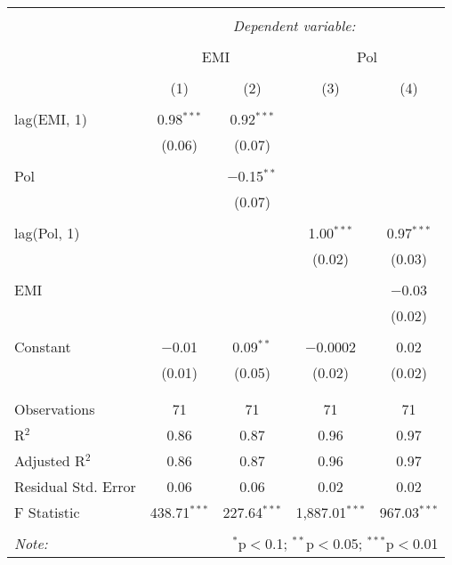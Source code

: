 
\begin{table}[!htbp] \centering 
  \caption{} 
  \label{} 
\begin{tabular}{@{\extracolsep{5pt}}lcccc} 
\\[-1.8ex]\hline 
\hline \\[-1.8ex] 
 & \multicolumn{4}{c}{\textit{Dependent variable:}} \\ 
\cline{2-5} 
\\[-1.8ex] & \multicolumn{2}{c}{EMI} & \multicolumn{2}{c}{Pol} \\ 
\\[-1.8ex] & (1) & (2) & (3) & (4)\\ 
\hline \\[-1.8ex] 
 lag(EMI, 1) & 0.98$^{***}$ & 0.92$^{***}$ &  &  \\ 
  & (0.06) & (0.07) &  &  \\ 
  & & & & \\ 
 Pol &  & $-$0.15$^{**}$ &  &  \\ 
  &  & (0.07) &  &  \\ 
  & & & & \\ 
 lag(Pol, 1) &  &  & 1.00$^{***}$ & 0.97$^{***}$ \\ 
  &  &  & (0.02) & (0.03) \\ 
  & & & & \\ 
 EMI &  &  &  & $-$0.03 \\ 
  &  &  &  & (0.02) \\ 
  & & & & \\ 
 Constant & $-$0.01 & 0.09$^{**}$ & $-$0.0002 & 0.02 \\ 
  & (0.01) & (0.05) & (0.02) & (0.02) \\ 
  & & & & \\ 
\hline \\[-1.8ex] 
Observations & 71 & 71 & 71 & 71 \\ 
R$^{2}$ & 0.86 & 0.87 & 0.96 & 0.97 \\ 
Adjusted R$^{2}$ & 0.86 & 0.87 & 0.96 & 0.97 \\ 
Residual Std. Error & 0.06 & 0.06 & 0.02 & 0.02 \\ 
F Statistic & 438.71$^{***}$ & 227.64$^{***}$ & 1,887.01$^{***}$ & 967.03$^{***}$ \\ 
\hline 
\hline \\[-1.8ex] 
\textit{Note:}  & \multicolumn{4}{r}{$^{*}$p$<$0.1; $^{**}$p$<$0.05; $^{***}$p$<$0.01} \\ 
\end{tabular} 
\end{table} 
